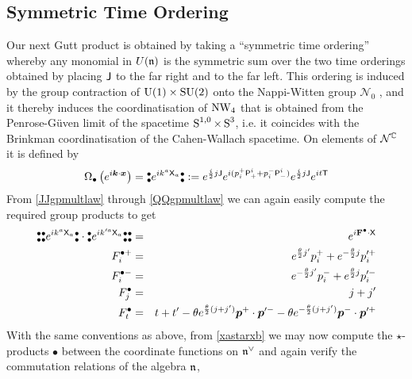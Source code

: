 \subsection{Symmetric Time Ordering}
\label{TSOP}
Our next Gutt product is obtained by taking a ``symmetric time ordering''
whereby any monomial in $U(\mfn)$ is the symmetric sum over the two time
orderings obtained by placing $\J$ to the far right and to the far left. This
ordering is induced by the group contraction of ${\rm U}(1)\times{\rm SU}(2)$
onto the Nappi-Witten group $\mathcal{N}_0$ \cite{DAK1}, and it thereby induces
the coordinatisation of $\NW_4$ that is obtained from the Penrose-G\"uven limit
of the spacetime $\S^{1,0}\times\S^3$, i.e. it coincides with the Brinkman
coordinatisation of the Cahen-Wallach spacetime. On elements of $\mathcal{N}^\C$
it is defined by
\begin{equation}
  \label{TOsymgpprods}
  \Omega_\bullet\left( e^{ i\mk\cdot\mx}\right)=
  \NOb  e^{ i k^a \X_a} \NOb:= e^{\frac i2 j \J} 
  e^{ i(p_i^+ \P^i_+
    +p_i^- \P^i_-)}  e^{\frac i2 j \J}  e^{ i t \T}
\end{equation}
From \eqref{JJgpmultlaw} through \eqref{QQgpmultlaw} we can again easily compute
the required group products to get
\begin{eqnarray}
  \label{TOsymgpprodexpl}
  \NOb  \NOb  e^{ i k^a \X_a} \NOb\cdot\NOb  e^{ i k^{\prime a} \X_a}
  \NOb  \NOb &=& e^{i{\bf F}^\bullet\cdot\X}\\\nn
  F^{\bullet+}_i&=& e^{\frac{\theta}2 j'} p_i^++
        e^{-\frac{\theta}2 j} p_i^{\prime +}\\\nn
  F^{\bullet-}_i&=&e^{-\frac{\theta}2 j'} p_i^-+
        e^{\frac{\theta}2 j} p_i^{\prime -}\\\nn
  F^\bullet_j&=&j+j'\\\nn
  F^\bullet_t&=&t+t'-\theta e^{\frac{\theta}2 (j+j' )} 
        \mbp^+\cdot\mbp^{\prime -}- \theta e^{-\frac{\theta}2 (j+j' )} 
        \mbp^-\cdot\mbp^{\prime +}
\end{eqnarray}
With the same conventions as above, from \eqref{xastarxb} we may now compute the
$\star$-products $\bullet$ between the coordinate functions on $\mfn^\vee$ and again
verify the commutation relations of the algebra $\mfn$,
